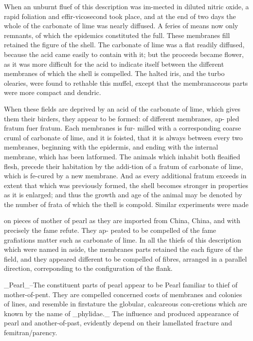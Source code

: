 \documentclass{article}
\begin{document}
When an unburnt fluef of this description was im-mected in diluted nitric oxide, a rapid foliation and effir-vicosecond took place, and at the end of two days the whole of the carbonate of lime was nearly diffused. A feries of means now only remnants, of which the epidemics constituted the full. These membranes fill retained the figure of the shell. The carbonate of lime was a flat readily diffused, because the acid came easily to contain with it; but the proceeds became flower, as it was more difficult for the acid to indicate itself between the different membranes of which the shell is compelled. The halted iris, and the turbo olearies, were found to rethable this muffel, except that the membranaceous parts were more compact and dendric.

When these fields are deprived by an acid of the carbonate of lime, which gives them their birders, they appear to be formed: of different membranes, ap- pled fratum fuer fratum. Each membranes is fur- milled with a corresponding coarse cruml of carbonate of lime, and it is foisted, that it is always between every two membranes, beginning with the epidermis, and ending with the internal membrane, which has been latformed. The animals which inhabit both fleaified flesh, precede their habitation by the addi-tion of a fratum of carbonate of lime, which is fe-cured by a new membrane. And as every additional fratum exceeds in extent that which was previously formed, the shell becomes stronger in properties as it is enlarged; and thus the growth and age of the animal may be denoted by the number of frata of which the thell is compold. Similar experiments were made

on pieces of mother of pearl as they are imported from China, China, and with precisely the fame refute. They ap- peated to be compelled of the fame grafiations matter such as carbonate of lime. In all the thiefs of this description which were named in aside, the membranes parts retained the each figure of the field, and they appeared different to be compelled of fibres, arranged in a parallel direction, correponding to the configuration of the flank.

\_Pearl\_--The constituent parts of pearl appear to be Pearl familiar to thief of mother-of-pent. They are compelled concerned costs of membranes and colonies of lines, and resemble in firstature the globular, calcareous con-cretions which are known by the name of \_phylidae.\_ The influence and produced appearance of pearl and another-of-past, evidently depend on their lamellated fracture and femitran/parency.
\end{document}
